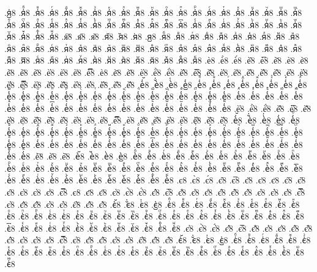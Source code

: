{.я᷹҆8
.я҆ⷠ8
.я҆ⷡ8
.я҆ⷢ8
.я҆ⷣ8
.я҆ⷤ8
.я҆ⷥ8
.я҆ⷦ8
.я҆ⷧ8
.я҆ⷨ8
.я҆ⷩ8
.я҆ⷪ8
.я҆ⷫ8
.я҆ⷬ8
.я҆ⷭ8
.я҆ⷮ8
.я҆ⷯ8
.я҆ⷰ8
.я҆ⷱ8
.я҆ⷲ8
.я҆ⷳ8
.я҆ⷴ8
.я҆ⷵ8
.я҆ⷶ8
.я҆ⷷ8
.я҆ⷸ8
.я҆ⷹ8
.я҆ⷺ8
.я҆ⷻ8
.я҆ⷼ8
.я҆ⷽ8
.я҆ⷾ8
.я҆ⷿ8
.я҆꙯8
.я҆ꙴ8
.я҆ꙵ8
.я҆ꙶ8
.я҆ꙷ8
.я҆ꙸ8
.я҆ꙹ8
.я҆ꙺ8
.я҆ꙻ8
.я҆꙼8
.я҆꙽8
.я҆ꚞ8
.я҆ꚟ8
.я҇8
.я᷀8
.я᷁8
.я᷶8
.я᷷8
.я᷸8
.я᷹8
.яⷠ8
.яⷡ8
.яⷢ8
.яⷣ8
.яⷤ8
.яⷥ8
.яⷦ8
.яⷧ8
.яⷨ8
.яⷩ8
.яⷪ8
.яⷫ8
.яⷬ8
.яⷭ8
.яⷮ8
.яⷯ8
.яⷰ8
.яⷱ8
.яⷲ8
.яⷳ8
.яⷴ8
.яⷵ8
.яⷶ8
.яⷷ8
.яⷸ8
.яⷹ8
.яⷺ8
.яⷻ8
.яⷼ8
.яⷽ8
.яⷾ8
.яⷿ8
.я꙯8
.яꙴ8
.яꙵ8
.яꙶ8
.яꙷ8
.яꙸ8
.яꙹ8
.яꙺ8
.яꙻ8
.я꙼8
.я꙽8
.яꚞ8
.яꚟ8
.ѐ8
.ѐ̀8
.ѐ́8
.ѐ̂8
.ѐ̅8
.ѐ̆8
.ѐ̇8
.ѐ̈8
.ѐ̋8
.ѐ̏8
.ѐ̑8
.ѐ̓8
.ѐ̔8
.ѐ̾8
.ѐ̿8
.ѐ͘8
.ѐ҃8
.ѐ҄8
.ѐ҅8
.ѐ҅̀8
.ѐ҅́8
.ѐ҅̂8
.ѐ҅̅8
.ѐ҅̆8
.ѐ҅̇8
.ѐ҅̈8
.ѐ҅̋8
.ѐ҅̏8
.ѐ҅̑8
.ѐ҅̓8
.ѐ҅̔8
.ѐ҅̾8
.ѐ҅̿8
.ѐ҅͘8
.ѐ҅҃8
.ѐ҅҄8
.ѐ҅҅8
.ѐ҅҆8
.ѐ҅҇8
.ѐ҅᷀8
.ѐ҅᷁8
.ѐ҅᷶8
.ѐ᷷҅8
.ѐ᷸҅8
.ѐ᷹҅8
.ѐ҅ⷠ8
.ѐ҅ⷡ8
.ѐ҅ⷢ8
.ѐ҅ⷣ8
.ѐ҅ⷤ8
.ѐ҅ⷥ8
.ѐ҅ⷦ8
.ѐ҅ⷧ8
.ѐ҅ⷨ8
.ѐ҅ⷩ8
.ѐ҅ⷪ8
.ѐ҅ⷫ8
.ѐ҅ⷬ8
.ѐ҅ⷭ8
.ѐ҅ⷮ8
.ѐ҅ⷯ8
.ѐ҅ⷰ8
.ѐ҅ⷱ8
.ѐ҅ⷲ8
.ѐ҅ⷳ8
.ѐ҅ⷴ8
.ѐ҅ⷵ8
.ѐ҅ⷶ8
.ѐ҅ⷷ8
.ѐ҅ⷸ8
.ѐ҅ⷹ8
.ѐ҅ⷺ8
.ѐ҅ⷻ8
.ѐ҅ⷼ8
.ѐ҅ⷽ8
.ѐ҅ⷾ8
.ѐ҅ⷿ8
.ѐ҅꙯8
.ѐ҅ꙴ8
.ѐ҅ꙵ8
.ѐ҅ꙶ8
.ѐ҅ꙷ8
.ѐ҅ꙸ8
.ѐ҅ꙹ8
.ѐ҅ꙺ8
.ѐ҅ꙻ8
.ѐ҅꙼8
.ѐ҅꙽8
.ѐ҅ꚞ8
.ѐ҅ꚟ8
.ѐ҆8
.ѐ҆̀8
.ѐ҆́8
.ѐ҆̂8
.ѐ҆̅8
.ѐ҆̆8
.ѐ҆̇8
.ѐ҆̈8
.ѐ҆̋8
.ѐ҆̏8
.ѐ҆̑8
.ѐ҆̓8
.ѐ҆̔8
.ѐ҆̾8
.ѐ҆̿8
.ѐ҆͘8
.ѐ҆҃8
.ѐ҆҄8
.ѐ҆҅8
.ѐ҆҆8
.ѐ҆҇8
.ѐ҆᷀8
.ѐ҆᷁8
.ѐ҆᷶8
.ѐ᷷҆8
.ѐ᷸҆8
.ѐ᷹҆8
.ѐ҆ⷠ8
.ѐ҆ⷡ8
.ѐ҆ⷢ8
.ѐ҆ⷣ8
.ѐ҆ⷤ8
.ѐ҆ⷥ8
.ѐ҆ⷦ8
.ѐ҆ⷧ8
.ѐ҆ⷨ8
.ѐ҆ⷩ8
.ѐ҆ⷪ8
.ѐ҆ⷫ8
.ѐ҆ⷬ8
.ѐ҆ⷭ8
.ѐ҆ⷮ8
.ѐ҆ⷯ8
.ѐ҆ⷰ8
.ѐ҆ⷱ8
.ѐ҆ⷲ8
.ѐ҆ⷳ8
.ѐ҆ⷴ8
.ѐ҆ⷵ8
.ѐ҆ⷶ8
.ѐ҆ⷷ8
.ѐ҆ⷸ8
.ѐ҆ⷹ8
.ѐ҆ⷺ8
.ѐ҆ⷻ8
.ѐ҆ⷼ8
.ѐ҆ⷽ8
.ѐ҆ⷾ8
.ѐ҆ⷿ8
.ѐ҆꙯8
.ѐ҆ꙴ8
.ѐ҆ꙵ8
.ѐ҆ꙶ8
.ѐ҆ꙷ8
.ѐ҆ꙸ8
.ѐ҆ꙹ8
.ѐ҆ꙺ8
.ѐ҆ꙻ8
.ѐ҆꙼8
.ѐ҆꙽8
.ѐ҆ꚞ8
.ѐ҆ꚟ8
.ѐ҇8
.ѐ᷀8
.ѐ᷁8
.ѐ᷶8
.ѐ᷷8
.ѐ᷸8
.ѐ᷹8
.ѐⷠ8
.ѐⷡ8
.ѐⷢ8
.ѐⷣ8
.ѐⷤ8
.ѐⷥ8
.ѐⷦ8
.ѐⷧ8
.ѐⷨ8
.ѐⷩ8
.ѐⷪ8
.ѐⷫ8
.ѐⷬ8
.ѐⷭ8
.ѐⷮ8
.ѐⷯ8
.ѐⷰ8
.ѐⷱ8
.ѐⷲ8
.ѐⷳ8
.ѐⷴ8
.ѐⷵ8
.ѐⷶ8
.ѐⷷ8
.ѐⷸ8
.ѐⷹ8
.ѐⷺ8
.ѐⷻ8
.ѐⷼ8
.ѐⷽ8
.ѐⷾ8
.ѐⷿ8
.ѐ꙯8
.ѐꙴ8
.ѐꙵ8
.ѐꙶ8
.ѐꙷ8
.ѐꙸ8
.ѐꙹ8
.ѐꙺ8
.ѐꙻ8
.ѐ꙼8
.ѐ꙽8
.ѐꚞ8
.ѐꚟ8
.є8
.є̀8
.є́8
.є̂8
.є̅8
.є̆8
.є̇8
.є̈8
.є̋8
.є̏8
.є̑8
.є̓8
.є̔8
.є̾8
.є̿8
.є͘8
.є҃8
.є҄8
.є҅8
.є҅̀8
.є҅́8
.є҅̂8
.є҅̅8
.є҅̆8
.є҅̇8
.є҅̈8
.є҅̋8
.є҅̏8
.є҅̑8
.є҅̓8
.є҅̔8
.є҅̾8
.є҅̿8
.є҅͘8
.є҅҃8
.є҅҄8
.є҅҅8
.є҅҆8
.є҅҇8
.є҅᷀8
.є҅᷁8
.є҅᷶8
.є᷷҅8
.є᷸҅8
.є᷹҅8
.є҅ⷠ8
.є҅ⷡ8
.є҅ⷢ8
.є҅ⷣ8
.є҅ⷤ8
.є҅ⷥ8
.є҅ⷦ8
.є҅ⷧ8
.є҅ⷨ8
.є҅ⷩ8
.є҅ⷪ8
.є҅ⷫ8
.є҅ⷬ8
.є҅ⷭ8
.є҅ⷮ8
.є҅ⷯ8
.є҅ⷰ8
.є҅ⷱ8
.є҅ⷲ8
.є҅ⷳ8
.є҅ⷴ8
.є҅ⷵ8
.є҅ⷶ8
.є҅ⷷ8
.є҅ⷸ8
.є҅ⷹ8
.є҅ⷺ8
.є҅ⷻ8
.є҅ⷼ8
.є҅ⷽ8
.є҅ⷾ8
.є҅ⷿ8
.є҅꙯8
.є҅ꙴ8
.є҅ꙵ8
.є҅ꙶ8
.є҅ꙷ8
.є҅ꙸ8
.є҅ꙹ8
.є҅ꙺ8
.є҅ꙻ8
.є҅꙼8
.є҅꙽8
.є҅ꚞ8
.є҅ꚟ8
.є҆8
.є҆̀8
.є҆́8
.є҆̂8
.є҆̅8
.є҆̆8
.є҆̇8
.є҆̈8
.є҆̋8
.є҆̏8
.є҆̑8
.є҆̓8
.є҆̔8
.є҆̾8
.є҆̿8
.є҆͘8
.є҆҃8
.є҆҄8
.є҆҅8
.є҆҆8
.є҆҇8
.є҆᷀8
.є҆᷁8
.є҆᷶8
.є᷷҆8
.є᷸҆8
.є᷹҆8
.є҆ⷠ8
.є҆ⷡ8
.є҆ⷢ8
.є҆ⷣ8
.є҆ⷤ8
.є҆ⷥ8
.є҆ⷦ8
.є҆ⷧ8
.є҆ⷨ8
.є҆ⷩ8
.є҆ⷪ8
.є҆ⷫ8
.є҆ⷬ8
.є҆ⷭ8
.є҆ⷮ8
.є҆ⷯ8
.є҆ⷰ8
.є҆ⷱ8
.є҆ⷲ8
.є҆ⷳ8
.є҆ⷴ8
.є҆ⷵ8
.є҆ⷶ8
.є҆ⷷ8
.є҆ⷸ8
.є҆ⷹ8
.є҆ⷺ8
.є҆ⷻ8
.є҆ⷼ8
}
